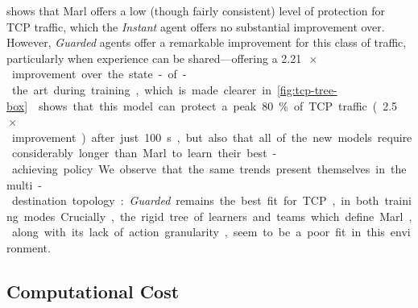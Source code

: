 \documentclass[10pt, times, comsoc]{IEEEtran}
\begin{document}
%	

 shows that Marl offers a low (though fairly consistent) level of protection for TCP traffic, which the \emph{Instant} agent offers no substantial improvement over.
However, \emph{Guarded} agents offer a remarkable improvement for this class of traffic, particularly when experience can be shared---offering a \SI{2.21}{$\!\times$} improvement over the state-of-the art during training, which is made clearer in \cref{fig:tcp-tree-box}.
 shows that this model can protect a peak \SI{80}{\percent} of TCP traffic (\SI{2.5}{$\!\times$} improvement) after just \SI{100}{\second}, but also that all of the new models require considerably longer than Marl to learn their best-achieving policy.

We observe that the same trends present themselves in the multi-destination topology: \emph{Guarded} remains the best fit for TCP, in both training modes.
Crucially, the rigid tree of learners and teams which define Marl, along with its lack of action granularity, seem to be a poor fit in this environment.


\subsection{Computational Cost}
\end{document}
